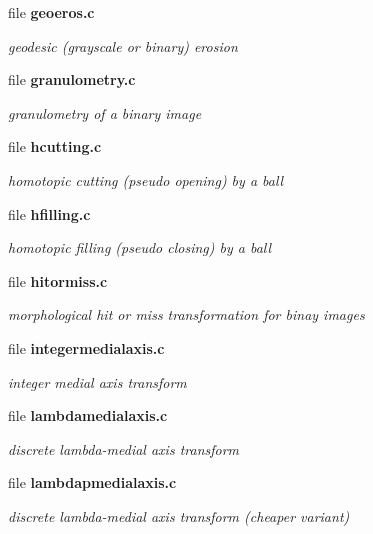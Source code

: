 \begin{CompactItemize}
\item 
file \bf{geoeros.c}
\begin{CompactList}\small\item\em geodesic (grayscale or binary) erosion \item\end{CompactList}

\item 
file \bf{granulometry.c}
\begin{CompactList}\small\item\em granulometry of a binary image \item\end{CompactList}

\item 
file \bf{hcutting.c}
\begin{CompactList}\small\item\em homotopic cutting (pseudo opening) by a ball \item\end{CompactList}

\item 
file \bf{hfilling.c}
\begin{CompactList}\small\item\em homotopic filling (pseudo closing) by a ball \item\end{CompactList}

\item 
file \bf{hitormiss.c}
\begin{CompactList}\small\item\em morphological hit or miss transformation for binay images \item\end{CompactList}

\item 
file \bf{integermedialaxis.c}
\begin{CompactList}\small\item\em integer medial axis transform \item\end{CompactList}

\item 
file \bf{lambdamedialaxis.c}
\begin{CompactList}\small\item\em discrete lambda-medial axis transform \item\end{CompactList}

\item 
file \bf{lambdapmedialaxis.c}
\begin{CompactList}\small\item\em discrete lambda-medial axis transform (cheaper variant) \item\end{CompactList}


\end{CompactItemize}
